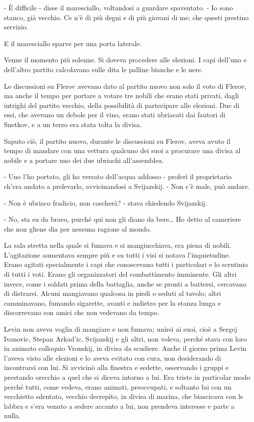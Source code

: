 - È difficile - disse il maresciallo, voltandosi a guardare spaventato. - Io sono stanco, già vecchio. Ce n'è di più degni e di più giovani di me; che questi prestino servizio. 

E il maresciallo sparve per una porta laterale. 

Venne il momento più solenne. Si doveva procedere alle elezioni. I capi dell'uno e dell'altro partito calcolavano sulle dita le palline bianche e le nere. 

Le discussioni su Flerov avevano dato al partito nuovo non solo il voto di Flerov, ma anche il tempo per portare a votare tre nobili che erano stati privati, dagli intrighi del partito vecchio, della possibilità di partecipare alle elezioni. Due di essi, che avevano un debole per il vino, erano stati ubriacati dai fautori di Snetkov, e a un terzo era stata tolta la divisa. 

Saputo ciò, il partito nuovo, durante le discussioni su Flerov, aveva avuto il tempo di mandare con una vettura qualcuno dei suoi a procurare una divisa al nobile e a portare uno dei due ubriachi all'assemblea. 

- Uno l'ho portato, gli ho versato dell'acqua addosso - proferì il proprietario ch'era andato a prelevarlo, avvicinandosi a Svijazskij. - Non c'è male, può andare. 

- Non è ubriaco fradicio, non cascherà? - stava chiedendo Svijazskij. 

- No, sta su da bravo, purché qui non gli diano da bere\ldots{} Ho detto al cameriere che non gliene dia per nessuna ragione al mondo. 

\label{xxix-4} 

La sala stretta nella quale si fumava e si mangiucchiava, era piena di nobili. L'agitazione aumentava sempre più e su tutti i visi si notava l'inquietudine. Erano agitati specialmente i capi che conoscevano tutti i particolari e lo scrutinio di tutti i voti. Erano gli organizzatori del combattimento imminente. Gli altri invece, come i soldati prima della battaglia, anche se pronti a battersi, cercavano di distrarsi. Alcuni mangiavano qualcosa in piedi o seduti al tavolo; altri camminavano, fumando sigarette, avanti e indietro per la stanza lunga e discorrevano con amici che non vedevano da tempo. 

Levin non aveva voglia di mangiare e non fumava; unirsi ai suoi, cioè a Sergej Ivanovic, Stepan Arkad'ic, Svijazskij e gli altri, non voleva, perché stava con loro in animato colloquio Vronskij, in divisa da scudiere. Anche il giorno prima Levin l'aveva visto alle elezioni e lo aveva evitato con cura, non desiderando di incontrarsi con lui. Si avvicinò alla finestra e sedette, osservando i gruppi e prestando orecchio a quel che si diceva intorno a lui. Era triste in particolar modo perché tutti, come vedeva, erano animati, preoccupati, e soltanto lui con un vecchietto sdentato, vecchio decrepito, in divisa di marina, che biascicava con le labbra e s'era venuto a sedere accanto a lui, non prendeva interesse e parte a nulla. 

